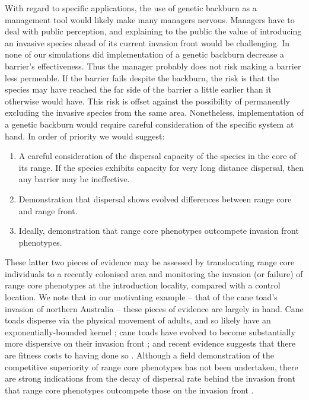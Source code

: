 \documentclass{article}
\begin{document}
With regard to specific applications, the use of genetic backburn as a management tool would likely make many managers nervous.  Managers have to deal with public perception, and explaining to the public the value of introducing an invasive species ahead of its current invasion front would be challenging.  In none of our simulations did implementation of a genetic backburn decrease a barrier's effectiveness.  Thus the manager probably does not risk making a barrier less permeable.  If the barrier fails despite the backburn, the risk is that the species may have reached the far side of the barrier a little earlier than it otherwise would have.  This risk is offset against the possibility of permanently excluding the invasive species from the same area.  Nonetheless, implementation of a genetic backburn would require careful consideration of the specific system at hand. In order of priority we would suggest:
\begin{enumerate}
	\item A careful consideration of the dispersal capacity of the species in the core of its range.  If the species exhibits capacity for very long distance dispersal, then any barrier may be ineffective.
	\item Demonstration that dispersal shows evolved differences between range core and range front.
	\item Ideally, demonstration that range core phenotypes outcompete invasion front phenotypes.
\end{enumerate}

These latter two pieces of evidence may be assessed by translocating range core individuals to a recently colonised area and monitoring the invasion (or failure) of range core phenotypes at the introduction locality, compared with a control location.  We note that in our motivating example -- that of the cane toad's invasion of northern Australia -- these pieces of evidence are largely in hand.  Cane toads disperse via the physical movement of adults, and so likely have an exponentially-bounded kernel \citep[e.g.,][]{Schwarzkopf2002}; cane toads have evolved to become substantially more dispersive on their invasion front \citep{Phillips_Brown_Travis_Shine_2008, Phillips2010}; and recent evidence suggests that there are fitness costs to having done so \citep{Brown2007, Hudson2015}.  Although a field demonstration of the competitive superiority of range core phenotypes has not been undertaken, there are strong indications from the decay of dispersal rate behind the invasion front that range core phenotypes outcompete those on the invasion front \citep{Lindstrom2013, Perkins2016}.
\end{document}
